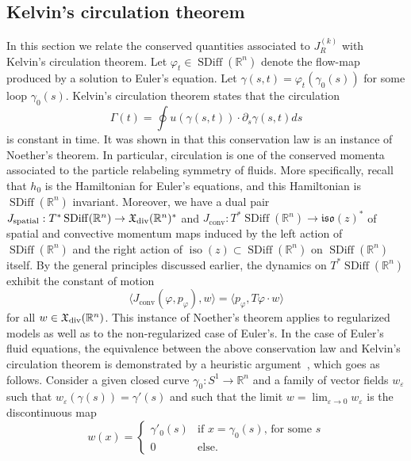 \documentclass[12pt]{amsart}
\newcommand{\dm}[1]{\todo[inline,color=yellow!20]{DM:  #1}}
\newcommand{\R}{\ensuremath{\mathbb{R}}}
\DeclareMathOperator{\SDiff}{SDiff}
\DeclareMathOperator{\iso}{iso}
\begin{document}
  \subsection{Kelvin's circulation theorem}
  \label{sec:Kelvin}
  In this section we relate the conserved quantities associated
  to $J_R^{(k)}$ with Kelvin's circulation theorem.
Let $\varphi_t \in \SDiff(\R^n)$ denote the flow-map
produced by a solution to Euler's equation.
Let $\gamma(s,t) = \varphi_t(\gamma_0(s))$ for some loop $\gamma_0(s)$.
Kelvin's circulation theorem states that the circulation
\begin{equation}\label{eq:Kelvin-circulation}
  \Gamma(t) = \oint u( \gamma(s,t) )  \cdot \partial_s \gamma(s,t) ds
\end{equation}
is constant in time.
It was shown in \cite{Arnold1966} that this conservation law
is an instance of Noether's theorem.
In particular, circulation is one of the conserved momenta
associated to the particle relabeling symmetry of fluids.
More specifically,
recall that $h_0$ is the Hamiltonian for Euler's equations,
and this Hamiltonian is $\SDiff(\R^n)$ invariant. Moreover, we have a dual pair
$J_\text{spatial}: T^*\SDiff(\R^n) \to \mathfrak{X}_{\rm div}(\R^n)^*$
and $J_\text{conv}: T^*\SDiff(\R^n) \to \mathfrak{iso}(z)^*$ of
spatial and convective momentum maps induced by
the left action of $\SDiff(\R^n)$ and the right action of
$\iso(z) \subset \SDiff(\R^n)$ on $\SDiff(\R^n)$ itself.
By the general principles discussed earlier, the dynamics on $T^*\SDiff(\R^n)$ exhibit the constant of motion
\begin{equation}\label{eq:abstract-circulation}
  \langle J_\text{conv}(\varphi,p_\varphi) , w \rangle
  = \langle p_\varphi , T\varphi \cdot w \rangle
\end{equation}
for all $w \in \mathfrak{X}_{\rm div}(\R^n)$.  
This instance of Noether's theorem applies to regularized models as well as to the non-regularized case of Euler's.
In the case of Euler's fluid equations, the equivalence between the above conservation law
and Kelvin's circulation theorem is demonstrated by a heuristic
argument~\cite[Ch~1, Thm~5.5]{ArnoldKhesin1998}, which goes as follows. 
Consider a given closed curve $\gamma_0\colon S^1 \to \R^n$ and a family
of vector fields $w_\varepsilon$ such that $w_\varepsilon(\gamma(s)) = \gamma'(s)$
and such that the limit $w = \lim_{\varepsilon \to 0} w_\varepsilon$ is the discontinuous map
\begin{equation*}
  w(x) = \begin{cases}
    \gamma'_0(s) & \text{if $x = \gamma_0(s)$, for some $s$}\\
    0          & \text{else.}
  \end{cases}
\end{equation*}
\end{document}
